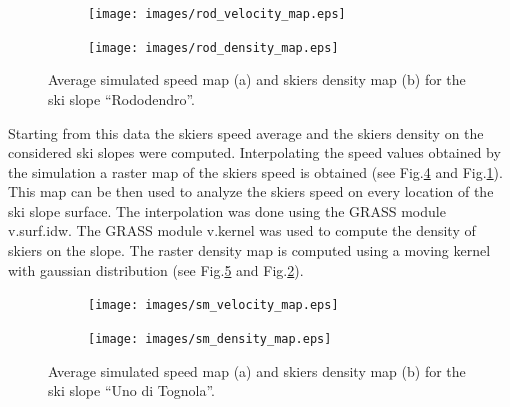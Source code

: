 \documentclass[12pt,a4paper,twoside]{book}
\begin{document}
\begin{figure}
        \centering
        \begin{subfigure}[b]{\textwidth}
                \centering
                \texttt{[image: images/rod\_velocity\_map.eps]}
                \caption{}\label{rododendro_vel}
        \end{subfigure}%

        \begin{subfigure}[b]{\textwidth}
                \centering
                \texttt{[image: images/rod\_density\_map.eps]}
                \caption{}\label{rododendro_den}
        \end{subfigure}
        \caption{Average simulated speed map (a) and skiers density map (b) for the ski slope ``Rododendro''.}\label{rododendro}
\end{figure}

Starting from this data the skiers speed average and the skiers density on the considered ski slopes were computed. Interpolating the speed values obtained by the simulation a raster map of the skiers speed is obtained (see Fig.\ref{uno_tognola_vel} and Fig.\ref{rododendro_vel}). This map can be then used to analyze the skiers speed on every location of the ski slope surface. The interpolation was done using the GRASS module v.surf.idw. The GRASS module v.kernel was used to compute the density of skiers on the slope. The raster density map is computed using a moving kernel with gaussian distribution (see Fig.\ref{uno_tognola_den} and Fig.\ref{rododendro_den}).

\begin{figure}
        \centering
        \begin{subfigure}[b]{\textwidth}
                \centering
                \texttt{[image: images/sm\_velocity\_map.eps]}
                \caption{}\label{uno_tognola_vel}
        \end{subfigure}%

        \begin{subfigure}[b]{\textwidth}
                \centering
                \texttt{[image: images/sm\_density\_map.eps]}
                \caption{}\label{uno_tognola_den}
        \end{subfigure}
        \caption{Average simulated speed map (a) and skiers density map (b) for the ski slope ``Uno di Tognola''.}\label{uno_tognola}
\end{figure}
\end{document}
